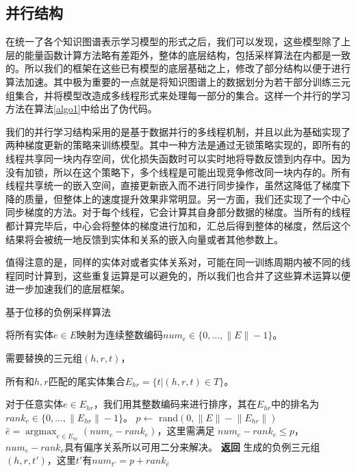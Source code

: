 \subsection{并行结构}

在统一了各个知识图谱表示学习模型的形式之后，我们可以发现，这些模型除了上层的能量函数计算方法略有差距外，整体的底层结构，包括采样算法在内都是一致的。所以我们的框架在这些已有模型的底层基础之上，修改了部分结构以便于进行算法加速。其中极为重要的一点就是将知识图谱上的数据划分为若干部分训练三元组集合，并将模型改造成多线程形式来处理每一部分的集合。这样一个并行的学习方法在算法\ref{algo1}中给出了伪代码。

我们的并行学习结构采用的是基于数据并行的多线程机制，并且以此为基础实现了两种梯度更新的策略来训练模型。其中一种方法是通过无锁策略实现的，即所有的线程共享同一块内存空间，优化损失函数时可以实时地将导数反馈到内存中。因为没有加锁，所以在这个策略下，多个线程是可能出现竞争修改同一块内存的。所有线程共享统一的嵌入空间，直接更新嵌入而不进行同步操作，虽然这降低了梯度下降的质量，但整体上的速度提升效果非常明显。另一方面，我们还实现了一个中心同步梯度的方法。对于每个线程，它会计算其自身部分数据的梯度。当所有的线程都计算完毕后，中心会将整体的梯度进行加和，汇总后得到整体的梯度，然后这个结果将会被统一地反馈到实体和关系的嵌入向量或者其他参数上。

值得注意的是，同样的实体对或者实体关系对，可能在同一训练周期内被不同的线程同时计算到，这些重复运算是可以避免的，所以我们也合并了这些算术运算以便进一步加速我们的底层框架。



\begin{algorithm}[t]
  \caption{基于位移的负例采样算法}
  \label{algo2}
  \begin{algorithmic}[1]
      \Ensure 将所有实体$e \in E$映射为连续整数编码$num_e \in \{0, ..., \lVert E \rVert  - 1\}$。
        \Require 

        需要替换的三元组$(h, r, t)$，

        所有和$h, r$匹配的尾实体集合$E_{hr} = \{t|(h,r,t)\in T\}$。

        对于任意实体$e \in E_{hr}$，我们用其整数编码来进行排序，其在$E_{hr}$中的排名为$rank_e \in \{0, ..., \lVert E_{hr} \rVert  - 1\}$。
        \State $p \leftarrow $ rand$(0, \lVert E \rVert - \lVert E_{hr} \rVert)$
        \State $\hat{e} = \mathop{\arg\max}_{e \in E_{hr}} (num_{e}-rank_{e})$，这里需满足 $num_{e}-rank_{e} \leq p$，$num_{e}-rank_{e}$具有偏序关系所以可用二分来解决。
        \State \textbf{返回} 生成的负例三元组$(h, r, t')$，这里$t'$有$num_{t'} = p + rank_{\hat{e}}$
  \end{algorithmic}
\end{algorithm}


